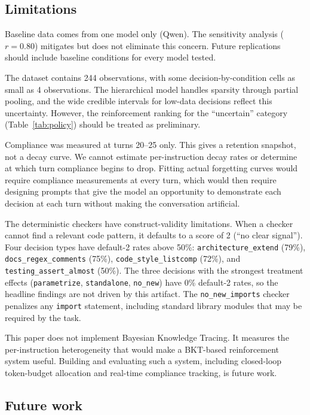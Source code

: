 \documentclass{llncs}
\begin{document}
\subsection{Limitations}
\label{sec:limitations}

Baseline data comes from one model only (Qwen). The sensitivity
analysis ($r = 0.80$) mitigates but does not eliminate this concern.
Future replications should include baseline conditions for every model
tested.

The dataset contains 244 observations, with some decision-by-condition
cells as small as 4 observations. The hierarchical model
handles sparsity through partial pooling, and the wide credible
intervals for low-data decisions reflect this uncertainty.
However, the reinforcement ranking for the ``uncertain'' category
(Table~\ref{tab:policy}) should be treated as preliminary.

Compliance was measured at turns 20--25 only. This gives a retention
snapshot, not a decay curve. We cannot estimate per-instruction decay
rates or determine at which turn compliance begins to drop. Fitting actual forgetting curves would
require compliance measurements at every turn, which would then require
designing prompts that give the model an opportunity to demonstrate
each decision at each turn without making the conversation artificial.

The deterministic checkers have construct-validity limitations. When a
checker cannot find a relevant code pattern, it defaults to a score of
2 (``no clear signal''). Four decision types have default-2 rates
above 50\%: \texttt{architecture\_extend} (79\%),
\texttt{docs\_regex\_comments} (75\%), \texttt{code\_style\_listcomp}
(72\%), and \texttt{testing\_assert\_almost} (50\%). The three
decisions with the strongest treatment effects (\texttt{parametrize},
\texttt{standalone}, \texttt{no\_new}) have 0\% default-2 rates, so
the headline findings are not driven by this artifact. The
\texttt{no\_new\_imports} checker penalizes any \texttt{import}
statement, including standard library modules that may be required by
the task.

This paper does not implement Bayesian Knowledge Tracing. It measures
the per-instruction heterogeneity that would make a BKT-based
reinforcement system useful. Building and evaluating such a system,
including closed-loop token-budget allocation and real-time compliance
tracking, is future work.

\subsection{Future work}
\end{document}
